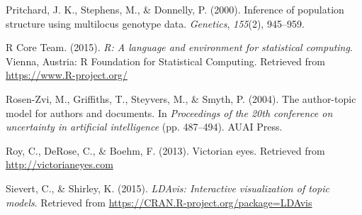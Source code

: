 \documentclass[12pt,]{article}
\begin{document}
\hypertarget{ref-pritchard2000inference}{}
Pritchard, J. K., Stephens, M., \& Donnelly, P. (2000). Inference of
population structure using multilocus genotype data. \emph{Genetics},
\emph{155}(2), 945--959.

\hypertarget{ref-r2015}{}
R Core Team. (2015). \emph{R: A language and environment for statistical
computing}. Vienna, Austria: R Foundation for Statistical Computing.
Retrieved from \url{https://www.R-project.org/}

\hypertarget{ref-rosen2004author}{}
Rosen-Zvi, M., Griffiths, T., Steyvers, M., \& Smyth, P. (2004). The
author-topic model for authors and documents. In \emph{Proceedings of
the 20th conference on uncertainty in artificial intelligence} (pp.
487--494). AUAI Press.

\hypertarget{ref-roy2013victorian}{}
Roy, C., DeRose, C., \& Boehm, F. (2013). Victorian eyes. Retrieved from
\url{http://victorianeyes.com}

\hypertarget{ref-r-LDAvis}{}
Sievert, C., \& Shirley, K. (2015). \emph{LDAvis: Interactive
visualization of topic models}. Retrieved from
\url{https://CRAN.R-project.org/package=LDAvis}
\end{document}
